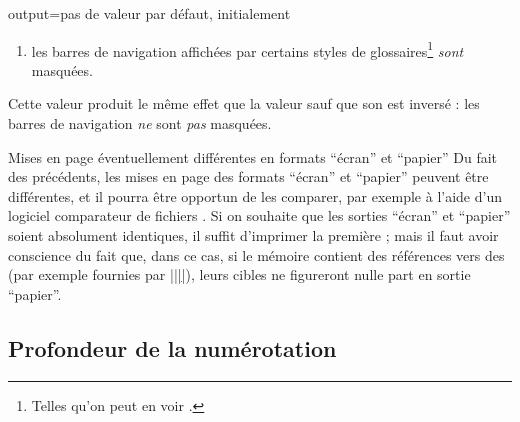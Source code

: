 \begin{docKey}{output}{=\textbar{}\textbar{}}{pas
    de valeur par défaut, initialement }
\begin{description}
\begin{enumerate}
\begin{enumerate}
      \end{enumerate}
    \item%
      \label{item-paper-2}%
      les barres de navigation affichées par certains styles de
      glossaires\footnote{Telles qu'on peut en voir
        .} \emph{sont} masquées.
    \end{enumerate}
  \item[\docValue{paper*}.]%
    Cette valeur produit le même effet que la valeur  sauf que
    son  est inversé : les barres de navigation \emph{ne}
    sont \emph{pas} masquées.
  \end{description}
\end{docKey}

\begin{dbwarning}{Mises en page éventuellement différentes en formats
    \enquote{écran} et \enquote{papier}}{}
  Du fait des  précédents, les mises en page des
  formats \enquote{écran} et \enquote{papier} peuvent être différentes, et il
  pourra être opportun de les comparer, par exemple à l'aide d'un logiciel
  comparateur de fichiers . Si on souhaite que les sorties
  \enquote{écran} et \enquote{papier} soient absolument identiques, il suffit
  d'imprimer la première ; mais il faut avoir conscience du fait que, dans ce
  cas, si le mémoire contient des références vers des  (par
  exemple fournies par
  |\href{|\meta{\normalfont\ttfamily\glsxtrshort*{url}}|}{||}|), leurs
  cibles ne figureront nulle part en sortie \enquote{papier}.
\end{dbwarning}

\subsection{Profondeur de la numérotation}\label{sec-profondeur-de-la}
%
%

